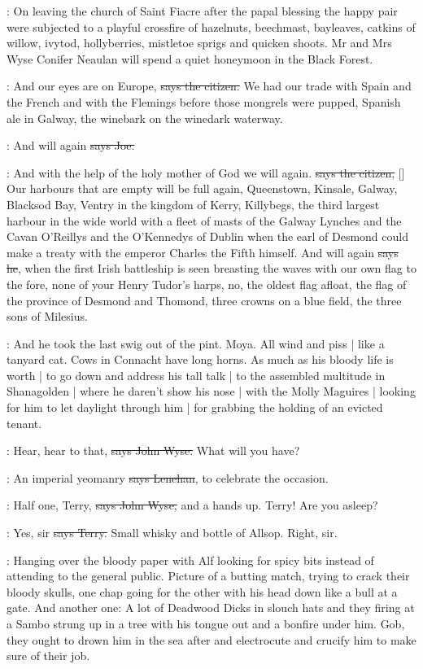 :
On leaving the church of Saint Fiacre  after the papal
blessing the happy pair were subjected to a playful crossfire
of hazelnuts,
beechmast,
bayleaves,
catkins of willow,
ivytod,
hollyberries,
mistletoe sprigs
and quicken shoots.
Mr and Mrs Wyse Conifer Neaulan
will spend a quiet honeymoon in the Black Forest.

\citizen:
And our eyes are on Europe,
\sout{says the citizen.}
We had our trade with
Spain and the French and with the Flemings before those mongrels were pupped,
Spanish ale in Galway,
the winebark on the winedark waterway.

\joe:
And will again
\sout{says Joe.}

\citizen:
And with the help of the holy mother of God
we will again.
\sout{says the citizen,}
[]
Our harbours that are empty will be full again,
Queenstown,
Kinsale,
Galway,
Blacksod Bay,
Ventry in the kingdom of Kerry,
Killybegs,
the third largest harbour in the wide world
with a fleet of masts
of the Galway Lynches
and the Cavan O'Reillys
and the O'Kennedys of Dublin
when the earl of Desmond
could make a treaty
with the emperor Charles the Fifth himself.
And will again
\sout{says he},
when the first Irish battleship is seen breasting the waves with our own flag to the fore,
none of your Henry Tudor's harps,
no,
the oldest flag afloat,
the flag of the province of Desmond and Thomond,
three crowns on a blue field,
the three sons of Milesius.%

\Nq:
And he took the last swig out of the pint.
Moya.
All wind and piss |
like a tanyard cat.
Cows in Connacht have long horns.
As much as his bloody life is worth |
to go down and address his tall talk |
to the assembled multitude in Shanagolden |
where he daren't show his nose |
with the Molly Maguires |
looking for him to let daylight through him |
for grabbing the holding of an evicted tenant.

\johnwyse:
Hear,
hear to that,
\sout{says John Wyse.}
What will you have?

\lenehan:
An imperial yeomanry
\sout{says Lenehan},
to celebrate the occasion.

\johnwyse:
Half one,
Terry,
\sout{says John Wyse,}
and a hands up.
Terry!
Are you asleep?

\terry:
Yes,
sir
\sout{says Terry.}
Small whisky and bottle of Allsop.
Right,
sir.

\Nq:
Hanging over the bloody paper with Alf looking for spicy bits instead
of attending to the general public.
Picture of a butting match,
trying to crack their bloody skulls,
one chap going for the other with his head down
like a bull at a gate.
And another one:
A lot of Deadwood Dicks in slouch hats
and they firing at a Sambo
strung up in a tree with his tongue out and a bonfire under him.
Gob,
they ought to drown him in the sea after
and electrocute and crucify him
to make sure of their job.


